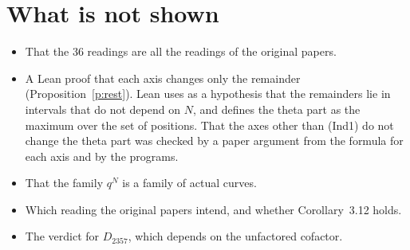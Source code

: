 \documentclass[11pt,a4paper]{article}
\theoremstyle{plain}
\theoremstyle{definition}
\theoremstyle{remark}
\begin{document}
\section{What is not shown}\label{s:notshown}
\begin{itemize}
\item That the 36 readings are all the readings of the original papers.
\item A Lean proof that each axis changes only the remainder (Proposition~\ref{p:rest}). Lean uses as a hypothesis that
the remainders lie in intervals that do not depend on $N$, and defines the theta part as the maximum over the set of
positions. That the axes other than (Ind1) do not change the theta part was checked by a paper argument from the
formula for each axis and by the programs.
\item That the family $q^N$ is a family of actual curves.
\item Which reading the original papers intend, and whether Corollary~3.12 holds.
\item The verdict for $D_{2357}$, which depends on the unfactored cofactor.
\end{itemize}
\end{document}
